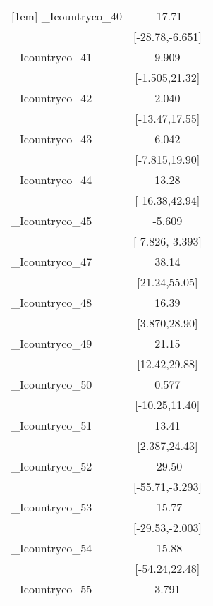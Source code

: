 {\begin{tabular}{l*{1}{c}}
[1em]
\_Icountryco\_40&                -17.71\sym{**} \\
            &       [-28.78,-6.651]         \\
[1em]
\_Icountryco\_41&                 9.909         \\
            &        [-1.505,21.32]         \\
[1em]
\_Icountryco\_42&                 2.040         \\
            &        [-13.47,17.55]         \\
[1em]
\_Icountryco\_43&                 6.042         \\
            &        [-7.815,19.90]         \\
[1em]
\_Icountryco\_44&                 13.28         \\
            &        [-16.38,42.94]         \\
[1em]
\_Icountryco\_45&                -5.609\sym{***}\\
            &       [-7.826,-3.393]         \\
[1em]
\_Icountryco\_47&                 38.14\sym{***}\\
            &         [21.24,55.05]         \\
[1em]
\_Icountryco\_48&                 16.39\sym{*}  \\
            &         [3.870,28.90]         \\
[1em]
\_Icountryco\_49&                 21.15\sym{***}\\
            &         [12.42,29.88]         \\
[1em]
\_Icountryco\_50&                 0.577         \\
            &        [-10.25,11.40]         \\
[1em]
\_Icountryco\_51&                 13.41\sym{*}  \\
            &         [2.387,24.43]         \\
[1em]
\_Icountryco\_52&                -29.50\sym{*}  \\
            &       [-55.71,-3.293]         \\
[1em]
\_Icountryco\_53&                -15.77\sym{*}  \\
            &       [-29.53,-2.003]         \\
[1em]
\_Icountryco\_54&                -15.88         \\
            &        [-54.24,22.48]         \\
[1em]
\_Icountryco\_55&                 3.791         \\

\end{tabular}}
